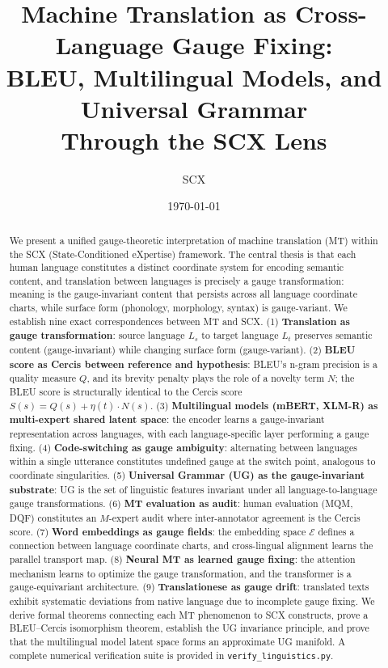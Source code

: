 \documentclass[12pt,a4paper]{article}
\title{\textbf{Machine Translation as Cross-Language Gauge Fixing:\\
BLEU, Multilingual Models, and Universal Grammar\\
Through the SCX Lens}}
\author{SCX}
\date{\today}
\theoremstyle{remark}
\newcommand{\Embed}{\mathcal{E}}
\newcommand{\SCX}{\textsf{SCX}}
\newcommand{\Cercis}{\textsf{Cercis}}
\begin{document}
\maketitle

\begin{abstract}
We present a unified gauge-theoretic interpretation of machine translation (MT)
within the \SCX{} (State-Conditioned eXpertise) framework. The central thesis is
that each human language constitutes a distinct coordinate system for encoding
semantic content, and translation between languages is precisely a gauge
transformation: meaning is the gauge-invariant content that persists across
all language coordinate charts, while surface form (phonology, morphology,
syntax) is gauge-variant. We establish nine exact correspondences between MT
and \SCX{}. (1) \textbf{Translation as gauge transformation}: source language
$L_s$ to target language $L_t$ preserves semantic content (gauge-invariant)
while changing surface form (gauge-variant). (2) \textbf{BLEU score as Cercis
between reference and hypothesis}: BLEU's n-gram precision is a quality
measure $Q$, and its brevity penalty plays the role of a novelty term $N$;
the BLEU score is structurally identical to the \Cercis{} score $S(s)=Q(s)+
\eta(t)\cdot N(s)$. (3) \textbf{Multilingual models (mBERT, XLM-R) as
multi-expert shared latent space}: the encoder learns a gauge-invariant
representation across languages, with each language-specific layer
performing a gauge fixing. (4) \textbf{Code-switching as gauge ambiguity}:
alternating between languages within a single utterance constitutes undefined
gauge at the switch point, analogous to coordinate singularities. (5)
\textbf{Universal Grammar (UG) as the gauge-invariant substrate}: UG is
the set of linguistic features invariant under all language-to-language
gauge transformations. (6) \textbf{MT evaluation as audit}: human evaluation
(MQM, DQF) constitutes an $M$-expert audit where inter-annotator agreement
is the \Cercis{} score. (7) \textbf{Word embeddings as gauge fields}: the
embedding space $\Embed$ defines a connection between language coordinate
charts, and cross-lingual alignment learns the parallel transport map.
(8) \textbf{Neural MT as learned gauge fixing}: the attention mechanism
learns to optimize the gauge transformation, and the transformer is a
gauge-equivariant architecture. (9) \textbf{Translationese as gauge drift}:
translated texts exhibit systematic deviations from native language due to
incomplete gauge fixing. We derive formal theorems connecting each MT
phenomenon to \SCX{} constructs, prove a BLEU--Cercis isomorphism theorem,
establish the UG invariance principle, and prove that the multilingual
model latent space forms an approximate UG manifold. A complete numerical
verification suite is provided in \texttt{verify\_linguistics.py}.
\end{abstract}
\end{document}
